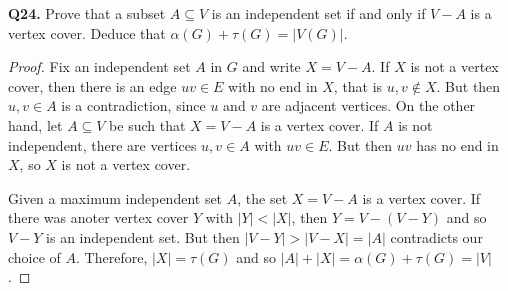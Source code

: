 \noindent \textbf{Q24.} Prove that a subset \( A \subseteq V \) is an independent set if and only if \( V - A \) is a vertex cover. Deduce that \( \alpha (G) + \tau (G) = |V(G)| \). 
\begin{proof}
Fix an independent set \( A \) in \( G \) and write \( X = V - A \). If \( X \) is not a vertex cover, then there is an edge \( uv \in E \) with no end in \( X \), that is \( u, v \notin X \). But then \( u, v \in A \) is a contradiction, since \( u \) and \( v \) are adjacent vertices. On the other hand, let \( A \subseteq V \) be such that \( X = V - A \) is a vertex cover. If \( A \) is not independent, there are vertices \( u,v \in A \) with \( uv \in E \). But then \( uv \) has no end in \( X \), so \( X \) is not a vertex cover.

Given a maximum independent set \( A \), the set \( X = V - A \) is a vertex cover. If there was anoter vertex cover \( Y \) with \( |Y| < |X| \), then \( Y = V - (V - Y) \) and so \( V - Y \) is an independent set. But then \( |V - Y| > |V - X| = |A| \) contradicts our choice of \( A \). Therefore, \( |X| = \tau (G) \) and so \( |A| + |X| = \alpha (G) + \tau (G) = |V| \). 
\end{proof}

